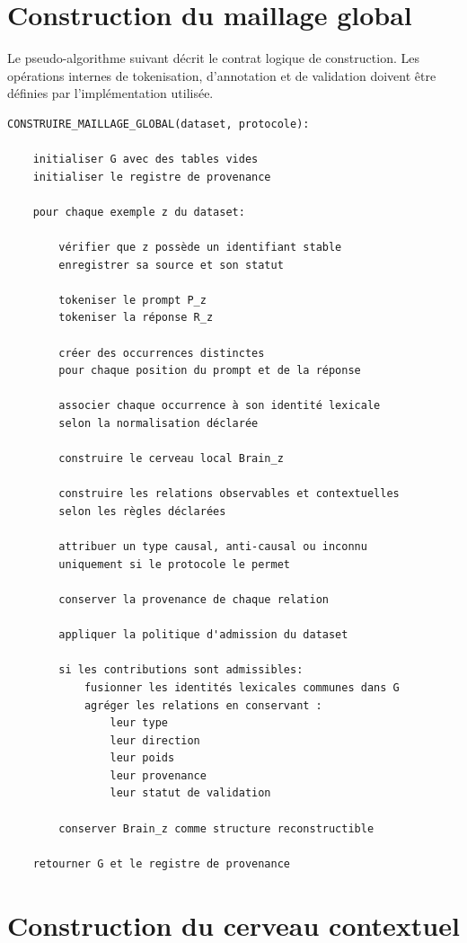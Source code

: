 \documentclass[11pt,a4paper,oneside]{book}
\theoremstyle{remark}
\begin{document}
\section{Construction du maillage global}

Le pseudo-algorithme suivant décrit le contrat logique de construction.
Les opérations internes de tokenisation, d'annotation et de validation
doivent être définies par l'implémentation utilisée.

\begin{verbatim}
CONSTRUIRE_MAILLAGE_GLOBAL(dataset, protocole):

    initialiser G avec des tables vides
    initialiser le registre de provenance

    pour chaque exemple z du dataset:

        vérifier que z possède un identifiant stable
        enregistrer sa source et son statut

        tokeniser le prompt P_z
        tokeniser la réponse R_z

        créer des occurrences distinctes
        pour chaque position du prompt et de la réponse

        associer chaque occurrence à son identité lexicale
        selon la normalisation déclarée

        construire le cerveau local Brain_z

        construire les relations observables et contextuelles
        selon les règles déclarées

        attribuer un type causal, anti-causal ou inconnu
        uniquement si le protocole le permet

        conserver la provenance de chaque relation

        appliquer la politique d'admission du dataset

        si les contributions sont admissibles:
            fusionner les identités lexicales communes dans G
            agréger les relations en conservant :
                leur type
                leur direction
                leur poids
                leur provenance
                leur statut de validation

        conserver Brain_z comme structure reconstructible

    retourner G et le registre de provenance
\end{verbatim}

\section{Construction du cerveau contextuel}
\end{document}
